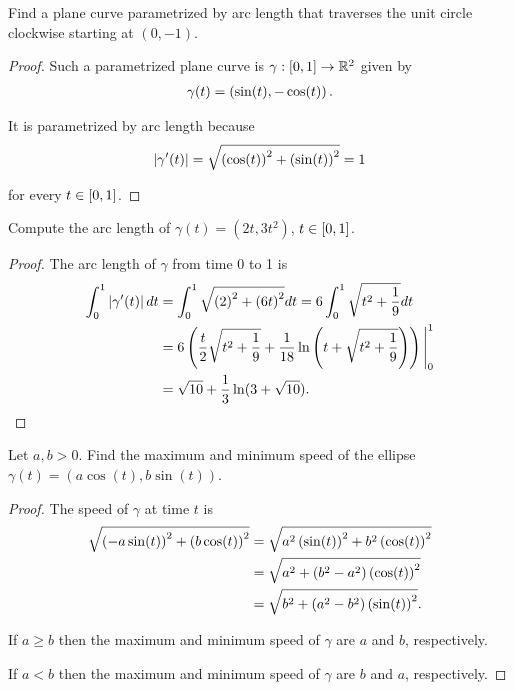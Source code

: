 \begin{exercise}{1.7}
	Find a plane curve parametrized by arc length that traverses the unit circle clockwise starting at $(0, -1)$.
\end{exercise}

\begin{proof}
	Such a parametrized plane curve is $\gamma: \left[{0,1}\right] \to \mathbb{R}^{2}$ given by
	\begin{align*}
		\gamma(t) = \left({\sin(t), -\cos(t)}\right).
	\end{align*}

	It is parametrized by arc length because
	\begin{align*}
		\left\vert{\gamma'(t)}\right\vert = \sqrt{\left({\cos(t)}\right)^{2} + \left({\sin(t)}\right)^{2}} = 1
	\end{align*}

	for every $t\in \left[{0, 1}\right]$.
\end{proof}

\begin{exercise}{1.8}
	Compute the arc length of $\gamma(t) = (2t, 3t^{2})$, $t\in \left[{0,1}\right]$.
\end{exercise}

\begin{proof}
	The arc length of $\gamma$ from time 0 to 1 is
	\begin{align*}
		\int^{1}_{0}\left\vert{\gamma'(t)}\right\vert dt & = \int^{1}_{0}\sqrt{\left({2}\right)^{2} + \left({6t}\right)^{2}}dt = 6\int^{1}_{0} \sqrt{t^{2} + \frac{1}{9}}dt                                         \\
		                               & = 6\left( \frac{t}{2}\sqrt{t^{2} + \frac{1}{9}} + \frac{1}{18}\ln\left(t + \sqrt{t^{2} + \frac{1}{9}}\right) \right){\Bigg{\vert}}^{1}_{0} \\
		                               & = \sqrt{10} + \frac{1}{3}\ln(3 + \sqrt{10}).\qedhere
	\end{align*}
\end{proof}

\begin{exercise}{1.9}
	Let $a, b > 0$. Find the maximum and minimum speed of the ellipse $\gamma(t) = (a\cos(t), b\sin(t))$.
\end{exercise}

\begin{proof}
	The speed of $\gamma$ at time $t$ is
	\begin{align*}
		\sqrt{\left({-a\sin(t)}\right)^{2} + \left({b\cos(t)}\right)^{2}} & = \sqrt{a^{2}\left({\sin(t)}\right)^{2} + b^{2}\left({\cos(t)}\right)^{2}} \\
		                                                    & = \sqrt{a^{2} + (b^{2} - a^{2})\left({\cos(t)}\right)^{2}}          \\
		                                                    & = \sqrt{b^{2} + (a^{2} - b^{2})\left({\sin(t)}\right)^{2}}.
	\end{align*}

	If $a \geq b$ then the maximum and minimum speed of $\gamma$ are $a$ and $b$, respectively.

	If $a < b$ then the maximum and minimum speed of $\gamma$ are $b$ and $a$, respectively.
\end{proof}

